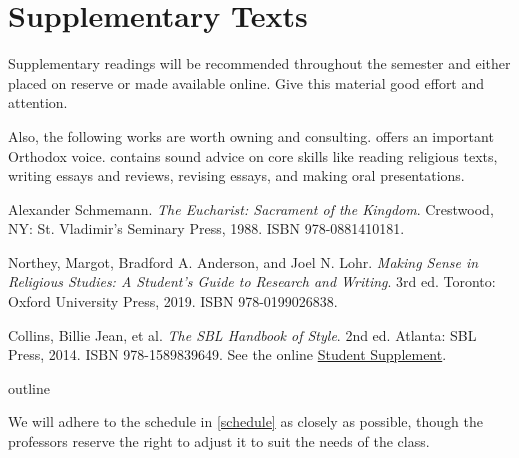 \documentclass[titlepage]{article}
\begin{document}
\section{Supplementary Texts}
\label{supplementary}

Supplementary readings will be recommended throughout the semester and
either placed on reserve or made available online. Give this material
good effort and attention.

Also, the following works are worth owning and consulting.
\cite{Schmemann} offers an important Orthodox voice. \cite{rlgs}
contains sound advice on core skills like reading religious texts,
writing essays and reviews, revising essays, and making oral
presentations.

\begingroup
\renewcommand{\section}[2]{}%
\begin{thebibliography}{Making Sense}%

	 Alexander Schmemann.
	\emph{The Eucharist: Sacrament of the Kingdom}.
	Crestwood, NY: St. Vladimir’s Seminary Press, 1988. ISBN 978-0881410181.

	 Northey, Margot, Bradford A. Anderson, and Joel N. Lohr.
	\emph{Making Sense in Religious Studies: A Student's Guide to Research and Writing}.
	3rd ed. Toronto: Oxford University Press, 2019. ISBN 978-0199026838.

	 Collins, Billie Jean, et al.
	\emph{The SBL Handbook of Style}.
	2nd ed. Atlanta: SBL Press, 2014. ISBN 978-1589839649.
	See the online \href{https://www.sbl-site.org/assets/pdfs/pubs/SBLHSsupp2015-02.pdf}{Student Supplement}.

\end{thebibliography}
\endgroup


\section{Course Outline}
\label{outline}

We will adhere to the schedule in \autoref{schedule} as closely as
possible, though the professors reserve the right to adjust it to suit
the needs of the class.
\end{document}
